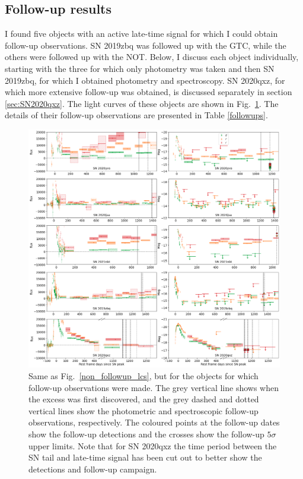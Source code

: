 \documentclass[a4paper,oneside,12pt, class=Latex/Classes/PhDthesisPSnPDF, crop=false]{standalone}
\begin{document}
\subsection{Follow-up results}
\label{followups_section}
I found five objects with an active late-time signal for which I could obtain follow-up observations. SN 2019zbq was followed up with the GTC, while the others were followed up with the NOT. Below, I discuss each object individually, starting with the three for which only photometry was taken and then SN 2019zbq, for which I obtained photometry and spectroscopy. SN 2020qxz, for which more extensive follow-up was obtained, is discussed separately in section \ref{sec:SN2020qxz}. The light curves of these objects are shown in Fig.~\ref{followup_lcs}. The details of their follow-up observations are presented in Table \ref{followups}.\\

\begin{figure}
    \centering
    \includegraphics[width=\textwidth]{../Images/chapter_5/followup_lcs.png}
    \caption{Same as Fig.~\ref{non_followup_lcs}, but for the objects for which follow-up observations were made. The grey vertical line shows when the excess was first discovered, and the grey dashed and dotted vertical lines show the photometric and spectroscopic follow-up observations, respectively. The coloured points at the follow-up dates show the follow-up detections and the crosses show the follow-up $5\sigma$ upper limits. Note that for SN 2020qxz the time period between the SN tail and late-time signal has been cut out to better show the detections and follow-up campaign.}
    \label{followup_lcs}
\end{figure}
\end{document}
